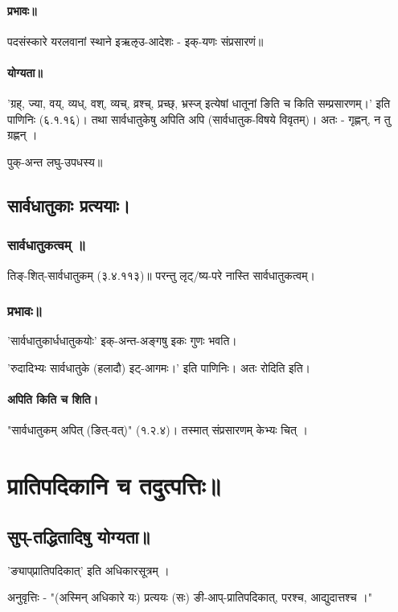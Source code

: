 \documentclass[oneside, article]{memoir}
\begin{document}
\subsubsection{प्रभावः॥}
पदसंस्कारे यरलवानां स्थाने इऋऌउ-आदेशः - इक्-यणः संप्रसारणं॥

\subsubsection{योग्यता॥}
'ग्रह्‌, ज्या, वय्‌, व्यध्‌, वश्‌, व्यच्‌, व्रश्च्‌, प्रच्छ्‌, भ्रस्ज्‌
इत्येषां धातूनां ङिति च किति सम्प्रसारणम्‌।' इति पाणिनिः (६.१.१६)। तथा सार्वधातुकेषु अपिति अपि (सार्वधातुक-विषये विवृतम्)। अतः - गृह्णन्, न तु ग्रह्णन् ।


पुक्-अन्त लघु-उपधस्य॥

\section{सार्वधातुकाः प्रत्ययाः।}

\subsection{सार्वधातुकत्वम् ॥}
तिङ्‌-शित्-सार्वधातुकम्‌ (३.४.११३)॥ परन्तु लृट्/ष्य-परे नास्ति सार्वधातुकत्वम्।

\subsection{प्रभावः॥}
'सार्वधातुकार्धधातुकयोः' इक्-अन्त-अङ्गषु इकः गुणः भवति।

'रुदादिभ्यः सार्वधातुके (हलादौ) इट्-आगमः।' इति पाणिनिः। अतः रोदिति इति।

\subsubsection{अपिति किति च शिति।}
"सार्वधातुकम् अपित्‌ (ङित्-वत्)" (१.२.४)। तस्मात् संप्रसारणम् केभ्यः चित् ।


\chapter{प्रातिपदिकानि च तदुत्पत्तिः॥}
\section{सुप्-तद्धितादिषु योग्यता॥}
'ङ्याप्‌प्रातिपदिकात्‌' इति अधिकारसूत्रम् ।

अनुवृत्तिः - "(अस्मिन् अधिकारे यः) प्रत्ययः (सः) ङी-आप्-प्रातिपदिकात्, परश्च, आद्युदात्तश्च ।"
\end{document}
